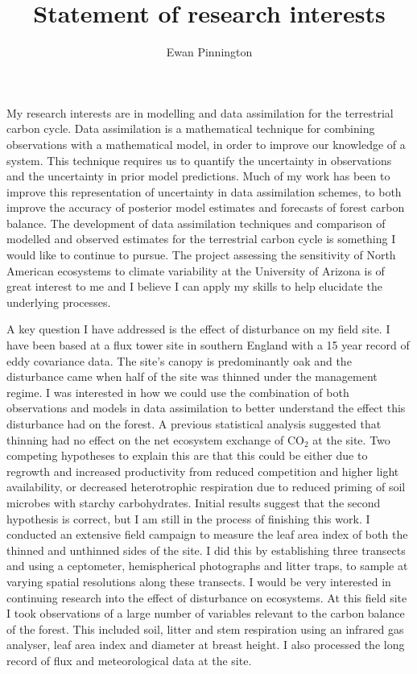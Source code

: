 \documentclass[11pt]{article}
\title{\vspace{-2cm}Statement of research interests}
\author{Ewan Pinnington}
\date{}
\begin{document}
\maketitle
\vspace{-.5cm}
My research interests are in modelling and data assimilation for the terrestrial carbon cycle. Data assimilation is a mathematical technique for combining observations with a mathematical model, in order to improve our knowledge of a system. This technique requires us to quantify the uncertainty in observations and the uncertainty in prior model predictions. Much of my work has been to improve this representation of uncertainty in data assimilation schemes, to both improve the accuracy of posterior model estimates and forecasts of forest carbon balance. The development of data assimilation techniques and comparison of modelled and observed estimates for the terrestrial carbon cycle is something I would like to continue to pursue. The project assessing the sensitivity of North American ecosystems to climate variability at the University of Arizona is of great interest to me and I believe I can apply my skills to help elucidate the underlying processes.

A key question I have addressed is the effect of disturbance on my field site. I have been based at a flux tower site in southern England with a 15 year record of eddy covariance data. The site's canopy is predominantly oak and the disturbance came when half of the site was thinned under the management regime. I was interested in how we could use the combination of both observations and models in data assimilation to better understand the effect this disturbance had on the forest. A previous statistical analysis suggested that thinning had no effect on the net ecosystem exchange of CO\(_{2}\) at the site. Two competing hypotheses to explain this are that this could be either due to regrowth and increased productivity from reduced competition and higher light availability, or decreased heterotrophic respiration due to reduced priming of soil microbes with starchy carbohydrates. Initial results suggest that the second hypothesis is correct, but I am still in the process of finishing this work. I conducted an extensive field campaign to measure the leaf area index of both the thinned and unthinned sides of the site. I did this by establishing three transects and using a ceptometer, hemispherical photographs and litter traps, to sample at varying spatial resolutions along these transects. I would be very interested in continuing research into the effect of disturbance on ecosystems. At this field site I took observations of a large number of variables relevant to the carbon balance of the forest. This included soil, litter and stem respiration using an infrared gas analyser, leaf area index and diameter at breast height. I also processed the long record of flux and meteorological data at the site. 
\end{document}
